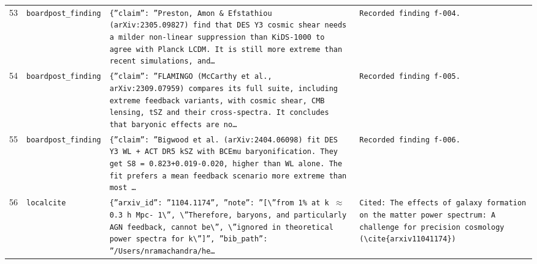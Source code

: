 \documentclass[11pt,a4paper]{article}
\begin{document}
\begin{longtable}{@{}p{}p{}p{}p{}@{}}
53 & \texttt{board}\newline\texttt{post\_\allowbreak{}finding} & \texttt{\{''claim'':\allowbreak{} ''Preston,\allowbreak{} Amon \& Efstathiou (arXiv:\allowbreak{}2305.09827)\allowbreak{} find that DES Y3 cosmic shear needs a milder non-linear suppression than KiDS-1000 to agree with Planck LCDM. It is still more extreme than recent simulations,\allowbreak{} and\ldots{}\allowbreak{}} & \texttt{Recorded finding f-004.} \\
54 & \texttt{board}\newline\texttt{post\_\allowbreak{}finding} & \texttt{\{''claim'':\allowbreak{} ''FLAMINGO (McCarthy et al.,\allowbreak{} arXiv:\allowbreak{}2309.07959)\allowbreak{} compares its full suite,\allowbreak{} including extreme feedback variants,\allowbreak{} with cosmic shear,\allowbreak{} CMB lensing,\allowbreak{} tSZ and their cross-spectra. It concludes that baryonic effects are no\ldots{}\allowbreak{}} & \texttt{Recorded finding f-005.} \\
55 & \texttt{board}\newline\texttt{post\_\allowbreak{}finding} & \texttt{\{''claim'':\allowbreak{} ''Bigwood et al. (arXiv:\allowbreak{}2404.06098)\allowbreak{} fit DES Y3 WL + ACT DR5 kSZ with BCEmu baryonification. They get S8 =\allowbreak{} 0.823+0.019-0.020,\allowbreak{} higher than WL alone. The fit prefers a mean feedback scenario more extreme than most \ldots{}\allowbreak{}} & \texttt{Recorded finding f-006.} \\
56 & \texttt{local}\newline\texttt{cite} & \texttt{\{''arxiv\_\allowbreak{}id'':\allowbreak{} ''1104.1174'',\allowbreak{} ''note'':\allowbreak{} ''[\textbackslash{}\allowbreak{}''from 1\% at k $\approx$ 0.3 h Mpc- 1\textbackslash{}\allowbreak{}'',\allowbreak{} \textbackslash{}\allowbreak{}''Therefore,\allowbreak{} baryons,\allowbreak{} and particularly AGN feedback,\allowbreak{} cannot be\textbackslash{}\allowbreak{}'',\allowbreak{} \textbackslash{}\allowbreak{}''ignored in theoretical power spectra for k\textbackslash{}\allowbreak{}'']\allowbreak{}'',\allowbreak{} ''bib\_\allowbreak{}path'':\allowbreak{} ''/\allowbreak{}Users/\allowbreak{}nramachandra/\allowbreak{}he\ldots{}\allowbreak{}} & \texttt{Cited:\allowbreak{} The effects of galaxy formation on the matter power spectrum:\allowbreak{} A challenge for precision cosmology (\textbackslash{}\allowbreak{}cite\{arxiv11041174\}\allowbreak{})\allowbreak{}} \\

\end{longtable}
\end{document}
